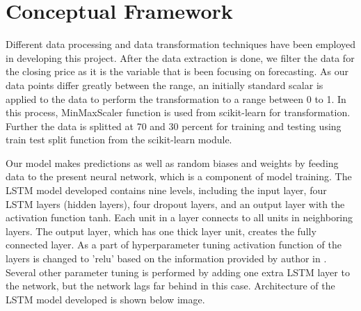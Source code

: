 \section{Conceptual Framework}
Different data processing and data transformation techniques have been employed in developing this project. After the data extraction is done, we filter the data for the closing price as it is the variable that is been focusing on forecasting. As our data points differ greatly between the range, an initially standard scalar is applied to the data to perform the transformation to a range between 0 to 1. In this process, MinMaxScaler function is used from scikit-learn for transformation. Further the data is splitted at 70 and 30 percent for training and testing using train test split function from the scikit-learn module.

Our model makes predictions as well as random biases and weights by feeding data to the present neural network, which is a component of model training. The LSTM model developed contains nine levels, including the input layer, four LSTM layers (hidden layers), four dropout layers, and an output layer with the activation function tanh. Each unit in a layer connects to all units in neighboring layers. The output layer, which has one thick layer unit, creates the fully connected layer. As a part of hyperparameter tuning activation function of the layers is changed to 'relu' based on the information provided by author in \cite{forecasting_dl}. Several other parameter tuning is performed by adding one extra LSTM layer to the network, but the network lags far behind in this case. 
Architecture of the LSTM model developed is shown below image.

